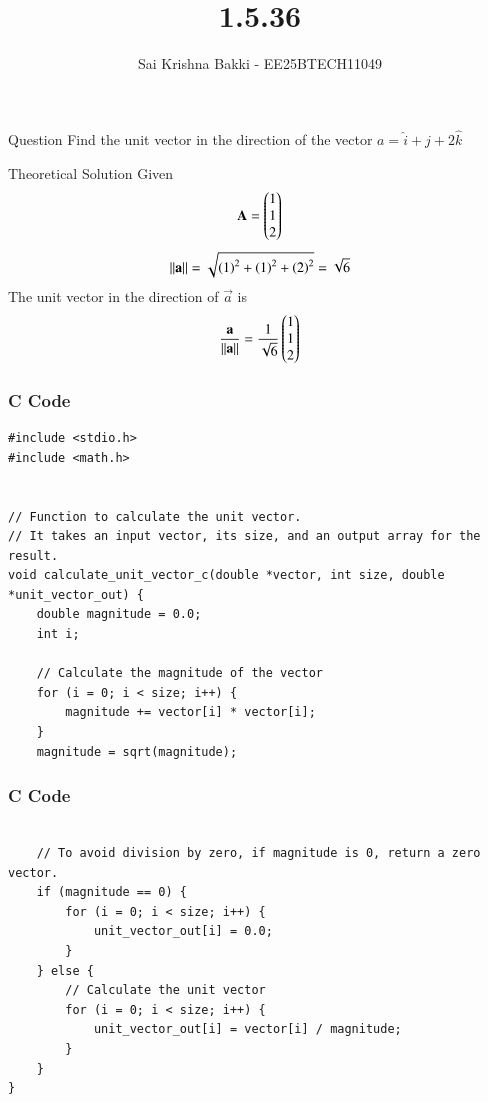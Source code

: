 \documentclass{beamer}
\title %
{1.5.36}
\date{}
\author %
{Sai Krishna Bakki - EE25BTECH11049}
\begin{document}
\frame{\titlepage}
\begin{frame}{Question}
Find the unit vector in the direction of the  vector ${a} = \hat{i} + \hat{j} + 2\hat{k}$ 
\end{frame}

\begin{frame}{Theoretical Solution}
Given 
\begin{align}
\mathbf{A}= \begin{pmatrix}1 \\ 1 \\2 \end{pmatrix}
\end{align}
\begin{align}
    {||\mathbf{a}||} =\sqrt{\left(1\right)^2+\left(1\right)^2+\left(2\right)^2}=\sqrt{6}
\end{align}
The unit vector in the direction of $\vec{a}$ is 
\begin{align}
    \frac{\mathbf{a}}{||\mathbf{a}||}=\frac{1}{\sqrt{6}}\begin{pmatrix}1\\1\\2\end{pmatrix}
\end{align}
\end{frame}
\begin{frame}[fragile]
\frametitle{C Code }
\begin{lstlisting}
#include <stdio.h>
#include <math.h>


// Function to calculate the unit vector.
// It takes an input vector, its size, and an output array for the result.
void calculate_unit_vector_c(double *vector, int size, double *unit_vector_out) {
    double magnitude = 0.0;
    int i;

    // Calculate the magnitude of the vector
    for (i = 0; i < size; i++) {
        magnitude += vector[i] * vector[i];
    }
    magnitude = sqrt(magnitude);
\end{lstlisting}
\end{frame}  

\begin{frame}[fragile]
\frametitle{C Code }
\begin{lstlisting}

    // To avoid division by zero, if magnitude is 0, return a zero vector.
    if (magnitude == 0) {
        for (i = 0; i < size; i++) {
            unit_vector_out[i] = 0.0;
        }
    } else {
        // Calculate the unit vector
        for (i = 0; i < size; i++) {
            unit_vector_out[i] = vector[i] / magnitude;
        }
    }
}
\end{lstlisting}
\end{frame}  
\end{document}
